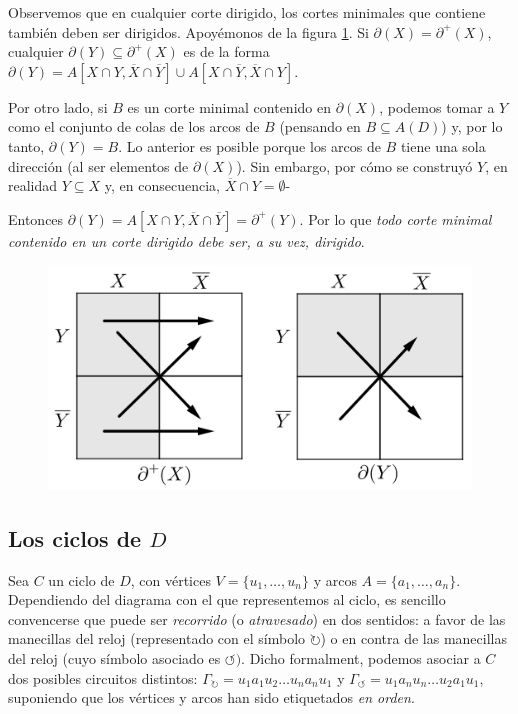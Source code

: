 Observemos que en cualquier corte dirigido, los cortes minimales que contiene también deben ser dirigidos. Apoyémonos de la figura \ref{fig:bondsdirigidos}. Si $\partial(X) = \partial^{+}(X)$, cualquier $\partial(Y) \subseteq \partial^{+}(X)$ es de la forma $\partial(Y) = A[X \cap Y, \overline{X} \cap \overline{Y}] \cup A[X \cap \overline{Y}, \overline{X} \cap Y] $. 

Por otro lado, si $B$ es un corte minimal contenido en $\partial(X)$, podemos tomar a $Y$ como el conjunto de colas de los arcos de $B$ (pensando en $B\subseteq A(D)$) y, por lo tanto, $\partial(Y) = B$. Lo anterior es posible porque los arcos de $B$ tiene una sola dirección (al ser elementos de $\partial(X)$). Sin embargo, por cómo se construyó $Y$, en realidad $Y\subseteq X$ y, en consecuencia, $\overline{X} \cap Y = \emptyset$-

Entonces $\partial(Y)= A[X \cap Y, \overline{X} \cap \overline{Y}] = \partial^{+}(Y)$. Por lo que \textit{todo corte minimal contenido en un corte dirigido debe ser, a su vez, dirigido}.

\begin{figure}[H]
    \centering
    \includegraphics[scale=0.15]{img/imgchapter2/bondsdirigidos.jpg}
    \caption{}
    \label{fig:bondsdirigidos}
\end{figure}


 \subsection{Los ciclos de $D$}
 
Sea $C$ un ciclo de $D$, con vértices $V=\{u_{1}, \ldots, u_{n}\}$ y arcos $A=\{a_{1},\ldots, a_{n}\}$. Dependiendo del diagrama con el que representemos al ciclo, es sencillo convencerse que puede ser \textit{recorrido} (o \textit{atravesado}) en dos sentidos: a favor de las manecillas del reloj (representado con el símbolo $\mathbf{\circlearrowright}$) o en contra de las manecillas del reloj (cuyo símbolo asociado es $\mathbf{\circlearrowleft})$. Dicho formalment, podemos asociar a $C$ dos posibles circuitos distintos: $\Gamma_{\mathbf{\circlearrowright}}=u_{1}a_{1}u_{2}\ldots u_{n}a_{n}u_{1}$ y $\Gamma_{\mathbf{\circlearrowleft}}=u_{1}a_{n}u_{n}\ldots u_{2}a_{1}u_{1}$, suponiendo que los vértices y arcos han sido etiquetados \textit{en orden}.

